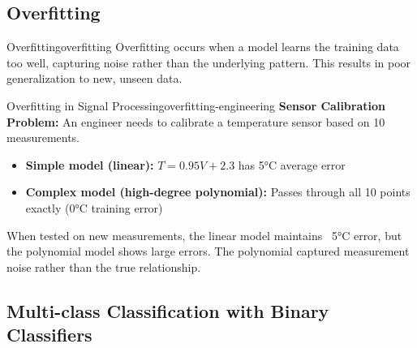 \documentclass[12pt]{article}
\begin{document}
\subsection{Overfitting}

\begin{definition}{Overfitting}{overfitting}
Overfitting occurs when a model learns the training data too well, capturing noise rather than the underlying pattern. This results in poor generalization to new, unseen data.
\end{definition}

\begin{example}{Overfitting in Signal Processing}{overfitting-engineering}
\textbf{Sensor Calibration Problem:} An engineer needs to calibrate a temperature sensor based on 10 measurements.

\begin{itemize}
    \item \textbf{Simple model (linear):} $T = 0.95V + 2.3$ has 5°C average error
    \item \textbf{Complex model (high-degree polynomial):} Passes through all 10 points exactly (0°C training error)
\end{itemize}

When tested on new measurements, the linear model maintains ~5°C error, but the polynomial model shows large errors. The polynomial captured measurement noise rather than the true relationship.

\begin{center}
\end{center}
\end{example}




\subsection{Multi-class Classification with Binary Classifiers}
\end{document}
